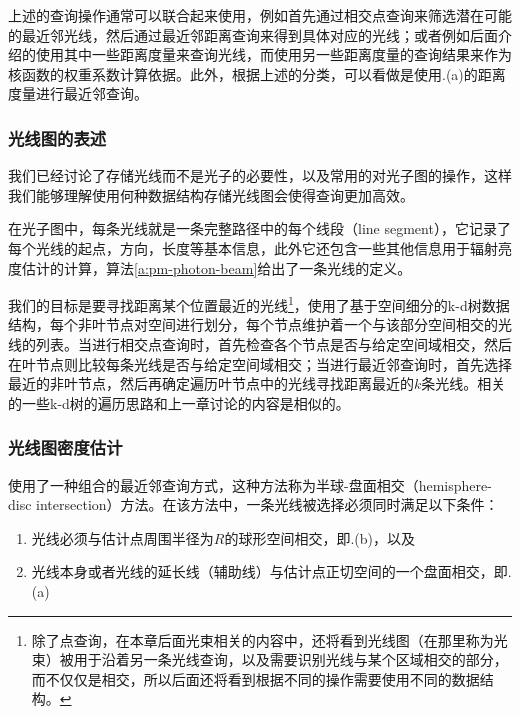 上述的查询操作通常可以联合起来使用，例如首先通过相交点查询来筛选潜在可能的最近邻光线，然后通过最近邻距离查询来得到具体对应的光线；或者例如后面介绍的使用其中一些距离度量来查询光线，而使用另一些距离度量的查询结果来作为核函数的权重系数计算依据。此外，根据上述的分类，\cite{a:AParticlePathbasedMethodforMonteCarloDensityEstimation}可以看做是使用.(a)的距离度量进行最近邻查询。




\subsubsection{光线图的表述}\label{sec:pm-ray-maps-data}
我们已经讨论了存储光线而不是光子的必要性，以及常用的对光子图的操作，这样我们能够理解使用何种数据结构存储光线图会使得查询更加高效。

在光子图中，每条光线就是一条完整路径中的每个线段（line segment），它记录了每个光线的起点，方向，长度等基本信息，此外它还包含一些其他信息用于辐射亮度估计的计算，算法\ref{a:pm-photon-beam}给出了一条光线的定义。

我们的目标是要寻找距离某个位置最近的光线\footnote{除了点查询，在本章后面光束相关的内容中，还将看到光线图（在那里称为光束）被用于沿着另一条光线查询，以及需要识别光线与某个区域相交的部分，而不仅仅是相交，所以后面还将看到根据不同的操作需要使用不同的数据结构。}，\cite{a:RayMapsforGlobalIllumination}使用了基于空间细分的k-d树数据结构，每个非叶节点对空间进行划分，每个节点维护着一个与该部分空间相交的光线的列表。当进行相交点查询时，首先检查各个节点是否与给定空间域相交，然后在叶节点则比较每条光线是否与给定空间域相交；当进行最近邻查询时，首先选择最近的非叶节点，然后再确定遍历叶节点中的光线寻找距离最近的$k$条光线。相关的一些k-d树的遍历思路和上一章讨论的内容是相似的。




\subsubsection{光线图密度估计}
\cite{a:RayMapsforGlobalIllumination}使用了一种组合的最近邻查询方式，这种方法称为半球-盘面相交（hemisphere-disc intersection）方法。在该方法中，一条光线被选择必须同时满足以下条件：

\begin{enumerate}
	\item 光线必须与估计点周围半径为$R$的球形空间相交，即.(b)，以及
	\item 光线本身或者光线的延长线（辅助线）与估计点正切空间的一个盘面相交，即.(a)
\end{enumerate}

